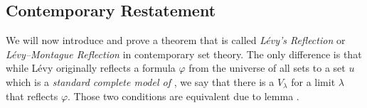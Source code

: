 \subsection{Contemporary Restatement}

\medskip We will now introduce and prove a theorem that is called \emph{Lévy's Reflection} or \emph{Lévy–Montague Reflection} in contemporary set theory. The only difference is that while Lévy originally reflects a formula $\varphi$ from the universe of all sets to a set $u$ which is a \emph{standard complete model of }, we say that there is a $V_\lambda$ for a limit $\lambda$ that reflects $\varphi$. Those two conditions are equivalent due to lemma .





